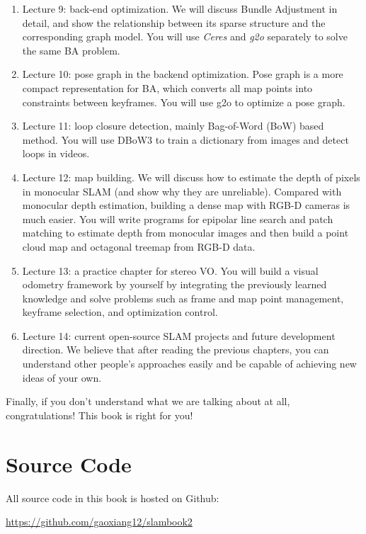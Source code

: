 \begin{enumerate}
	\item Lecture 9: back-end optimization. We will discuss Bundle Adjustment in detail, and show the relationship between its sparse structure and the corresponding graph model. You will use \textit{Ceres} and \textit{g2o} separately to solve the same BA problem.
	
	\item Lecture 10: pose graph in the backend optimization. Pose graph is a more compact representation for BA, which converts all map points into constraints between keyframes. You will use g2o to optimize a pose graph.
	
	\item Lecture 11: loop closure detection, mainly Bag-of-Word (BoW) based method. You will use DBoW3 to train a dictionary from images and detect loops in videos. 
	
	\item Lecture 12: map building. We will discuss how to estimate the depth of pixels in monocular SLAM  (and show why they are unreliable). Compared with monocular depth estimation, building a dense map with RGB-D cameras is much easier. You will write programs for epipolar line search and patch matching to estimate depth from monocular images and then build a point cloud map and octagonal treemap from RGB-D data.
	
	\item Lecture 13: a practice chapter for stereo VO. You will build a visual odometry framework by yourself by integrating the previously learned knowledge and solve problems such as frame and map point management, keyframe selection, and optimization control.
	
	\item Lecture 14: current open-source SLAM projects and future development direction. We believe that after reading the previous chapters, you can understand other people's approaches easily and be capable of achieving new ideas of your own.
\end{enumerate}

Finally, if you don't understand what we are talking about at all, congratulations! This book is right for you! 

\section{Source Code}

All source code in this book is hosted on Github:

{\hfill\url{https://github.com/gaoxiang12/slambook2}\hfill}

